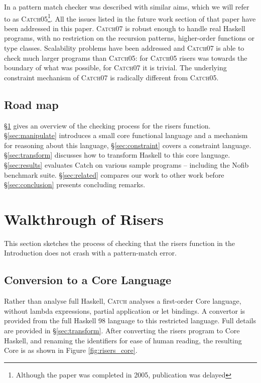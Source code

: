 \documentclass[preprint]{sigplanconf}
\newcommand{\C}[1]{\textsf{#1}}
\newcommand{\catch}{\textsc{Catch}}
\begin{document}
In \citet{me:catch_tfp} a pattern match checker was described with similar aims, which we will refer to as \catch05\footnote{Although the paper was completed in 2005, publication was delayed}. All the issues listed in the future work section of that paper have been addressed in this paper. \catch07 is robust enough to handle real Haskell programs, with no restriction on the recursion patterns, higher-order functions or type classes. Scalability problems have been addressed and \catch07 is able to check much larger programs than \catch05: for \catch05 risers was towards the boundary of what was possible, for \catch07 it is trivial. The underlying constraint mechanism of \catch07 is radically different from \catch05.

\subsection{Road map}

\S\ref{sec:walkthrough} gives an overview of the checking process for the \C{risers} function. \S\ref{sec:manipulate} introduces a small core functional language and a mechanism for reasoning about this language, \S\ref{sec:constraint} covers a constraint language. \S\ref{sec:transform} discusses how to transform Haskell to this core language. \S\ref{sec:results} evaluates Catch on various sample programs -- including the Nofib benchmark suite. \S\ref{sec:related} compares our work to other work before \S\ref{sec:conclusion} presents concluding remarks.

\section{Walkthrough of Risers}
\label{sec:walkthrough}

This section sketches the process of checking that the \C{risers} function in the Introduction does not crash with a pattern-match error.


\subsection{Conversion to a Core Language}

Rather than analyse full Haskell, \catch{} analyses a first-order Core language, without lambda expressions, partial application or let bindings. A convertor is provided from the full Haskell 98 language to this restricted language. Full details are provided in \S\ref{sec:transform}. After converting the \C{risers} program to Core Haskell, and renaming the identifiers for ease of human reading, the resulting Core is as shown in Figure \ref{fig:risers_core}.
\end{document}
